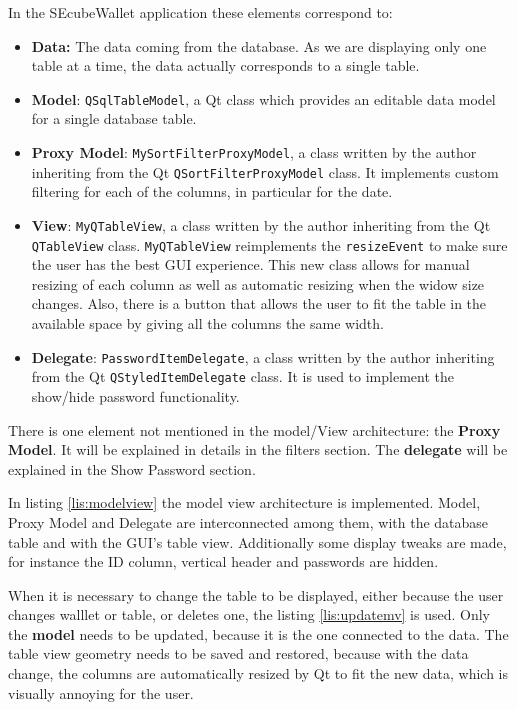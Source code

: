 In the SEcubeWallet application these elements correspond to:

\begin{itemize}
\setlength\itemsep{-3pt}

\item \textbf{Data:} The data coming from the database. As we are displaying only one table at a time, the data actually corresponds to a single table.
\item \textbf{Model}: \texttt{QSqlTableModel}, a Qt class which provides an editable data model for a single database table.
\item \textbf{Proxy Model}: \texttt{MySortFilterProxyModel}, a class written by the author inheriting from the Qt \texttt{QSortFilterProxyModel} class. It implements custom filtering for each of the columns, in particular for the date.
\item \textbf{View}: \texttt{MyQTableView}, a class written by the author inheriting from the Qt \texttt{QTableView} class. \texttt{MyQTableView} reimplements the \texttt{resizeEvent} to make sure the user has the best GUI experience. This new class allows for manual resizing of each column as well as automatic resizing when the widow size changes. Also, there is a button that allows the user to fit the table in the available space by giving all the columns the same width.
\item \textbf{Delegate}: \texttt{PasswordItemDelegate}, a class written by the author inheriting from the Qt \texttt{QStyledItemDelegate} class. It is used to implement the show/hide password functionality.
\end{itemize}

There is one element not mentioned in the model/View architecture: the \textbf{Proxy Model}. It will be explained in details in the filters section. The \textbf{delegate} will be explained in the Show Password section.

In listing \ref{lis:modelview} the model view architecture is implemented. Model, Proxy Model and Delegate are interconnected among them, with the database table and with the GUI's table view. Additionally some display tweaks are made, for instance the ID column, vertical header and passwords are hidden.



When it is necessary to change the table to be displayed, either because the user changes walllet or table, or deletes one, the listing \ref{lis:updatemv} is used. Only the \textbf{model} needs to be updated, because it is the one connected to the data. The table view geometry needs to be saved and restored, because with the data change, the columns are automatically resized by Qt to fit the new data, which is visually annoying for the user.

